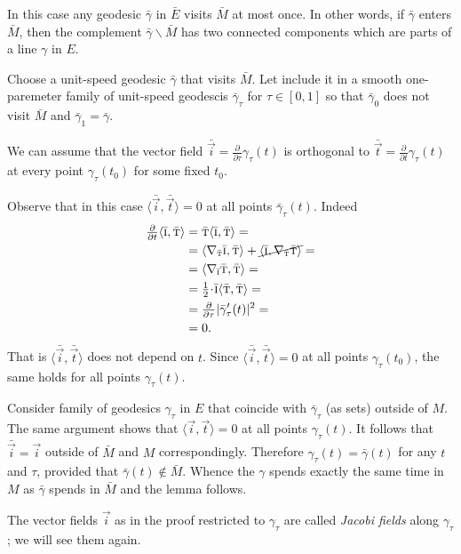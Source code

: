 In this case any geodesic $\bar\gamma$ in $\bar E$ visits $\bar M$ at most once.
In other words, if $\bar\gamma$ enters $\bar M$, then the complement $\bar\gamma\backslash \bar M$ has two connected components which are parts of a line $\gamma$ in $E$.

Choose a unit-speed geodesic $\bar\gamma$ that visits $\bar M$.
Let include it in a smooth one-paremeter family of unit-speed geodescis $\bar\gamma_\tau$ for $\tau\in [0,1]$ so that $\bar\gamma_0$ does not visit $\bar M$ and $\bar \gamma_1=\bar \gamma$.

We can assume that 
the vector field $\bar{\vec i}
=\tfrac{\partial}{\partial\tau}\gamma_\tau(t)$ is orthogonal to $\bar{\vec t}
=\tfrac{\partial}{\partial t}\gamma_\tau(t)$ at every point $\gamma_\tau(t_0)$ for some fixed $t_0$.

Observe that in this case $\langle\bar{\vec i},\bar{\vec t}\rangle=0$ at all points $\bar\gamma_\tau(t)$.
Indeed 
\begin{align*}
\tfrac{\partial}{\partial t}\langle\bar{\vec i},\bar{\vec t}\rangle&=
\bar{\vec t}\langle\bar{\vec i},\bar{\vec t}\rangle=
\\
&=
\langle\nabla_{\bar{\vec t}}\bar{\vec i},\bar{\vec t}\rangle+\cancel{\langle\bar{\vec i},\nabla_{\bar{\vec t}}\bar{\vec t}\rangle}=
\\
&=\langle\nabla_{\bar{\vec i}}\bar{\vec t},\bar{\vec t}\rangle=
\\
&=\tfrac12\cdot\bar{\vec i}\langle\bar{\vec t},\bar{\vec t}\rangle=
\\
&=\tfrac{\partial}{\partial \tau}|\bar\gamma_\tau'(t)|^2=
\\
&=0.
\end{align*}
That is $\langle\bar{\vec i},\bar{\vec t}\rangle$ does not depend on $t$.
Since $\langle\bar{\vec i},\bar{\vec t}\rangle=0$ at all points $\gamma_\tau(t_0)$, the same holds for all points  $\gamma_\tau(t)$.

Consider family of geodesics $\gamma_\tau$ in $E$ that coincide with $\bar\gamma_\tau$ (as sets) outside of $M$.
The same argument shows that $\langle\vec i,\vec t\rangle=0$ at all points $\gamma_\tau(t)$.
It follows that $\bar{\vec i}=\vec i$ outside of $\bar M$ and $M$ correspondingly.
Therefore $\gamma_\tau(t)=\bar\gamma(t)$ for any $t$ and $\tau$, provided that $\bar\gamma(t)\notin \bar M$.
Whence the $\gamma$ spends exactly the same time in $M$ as 
$\bar \gamma$ spends in $\bar M$ and the lemma follows.\qeds

 The vector fields $\vec i$  as in the proof restricted to $\gamma_\tau$ are called \emph{Jacobi fields} along $\gamma_\tau$;
we will see them again.

